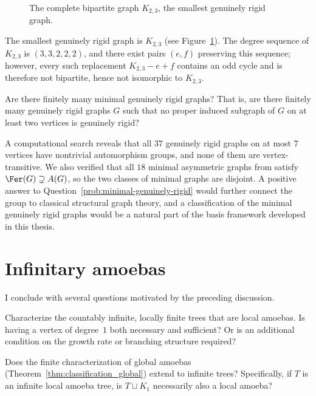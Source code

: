 \begin{figure}[ht]
	\centering
	
	\caption{The complete bipartite graph $K_{2,3}$, the smallest genuinely	rigid graph.}
	\label{fig:K23}
\end{figure}

The smallest genuinely rigid graph is $K_{2,3}$ (see Figure~\ref{fig:K23}).
The degree sequence of $K_{2,3}$ is $(3,3,2,2,2)$, and there exist pairs $(e,f)$ preserving this sequence; however, every such replacement $K_{2,3} - e + f$ contains an odd cycle and is therefore not bipartite, hence not isomorphic to $K_{2,3}$.

\begin{question}\label{prob:minimal-genuinely-rigid}
	Are there finitely many minimal genuinely rigid graphs?
	That is, are there finitely many genuinely rigid graphs $G$ such that no proper induced subgraph of $G$ on at least two vertices is	genuinely rigid?
\end{question}

A computational search reveals that all $37$ genuinely rigid graphs on at most $7$ vertices have nontrivial automorphism groups, and none of them are vertex-transitive.
We also verified that all $18$ minimal asymmetric graphs from \cite{SCHWEITZER2017215} satisfy $\Fer(G) \supsetneq A(G)$, so the two classes of minimal graphs are disjoint.
A positive answer to Question~\ref{prob:minimal-genuinely-rigid} would further connect the \tFer group to classical structural graph theory, and a classification of the minimal genuinely rigid graphs would be a natural part of the basis framework developed in this thesis.

\section{Infinitary amoebas}\label{sec:inf-amoebas-open-questions}

I conclude with several questions motivated by the preceding discussion.

\begin{question}\label{q:char-local-amoeba-trees}
    Characterize the countably infinite, locally finite trees that are local amoebas.
    Is having a vertex of degree~$1$ both necessary and sufficient?
    Or is an additional condition on the growth rate or branching structure required?
\end{question}

\begin{question}\label{q:global-amoeba-infinite}
    Does the finite characterization of global amoebas (Theorem~\ref{thm:classification_global}) extend to infinite trees?
    Specifically, if $T$ is an infinite local amoeba tree, is $T\sqcup K_1$ necessarily also a local amoeba?
\end{question}

